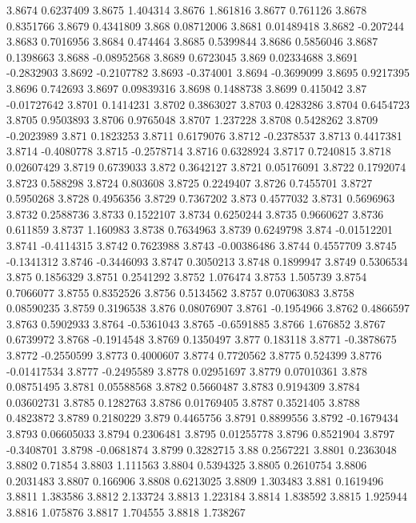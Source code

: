 3.8674  0.6237409
3.8675  1.404314
3.8676  1.861816
3.8677  0.761126
3.8678  0.8351766
3.8679  0.4341809
3.868  0.08712006
3.8681  0.01489418
3.8682  -0.207244
3.8683  0.7016956
3.8684  0.474464
3.8685  0.5399844
3.8686  0.5856046
3.8687  0.1398663
3.8688  -0.08952568
3.8689  0.6723045
3.869  0.02334688
3.8691  -0.2832903
3.8692  -0.2107782
3.8693  -0.374001
3.8694  -0.3699099
3.8695  0.9217395
3.8696  0.742693
3.8697  0.09839316
3.8698  0.1488738
3.8699  0.415042
3.87  -0.01727642
3.8701  0.1414231
3.8702  0.3863027
3.8703  0.4283286
3.8704  0.6454723
3.8705  0.9503893
3.8706  0.9765048
3.8707  1.237228
3.8708  0.5428262
3.8709  -0.2023989
3.871  0.1823253
3.8711  0.6179076
3.8712  -0.2378537
3.8713  0.4417381
3.8714  -0.4080778
3.8715  -0.2578714
3.8716  0.6328924
3.8717  0.7240815
3.8718  0.02607429
3.8719  0.6739033
3.872  0.3642127
3.8721  0.05176091
3.8722  0.1792074
3.8723  0.588298
3.8724  0.803608
3.8725  0.2249407
3.8726  0.7455701
3.8727  0.5950268
3.8728  0.4956356
3.8729  0.7367202
3.873  0.4577032
3.8731  0.5696963
3.8732  0.2588736
3.8733  0.1522107
3.8734  0.6250244
3.8735  0.9660627
3.8736  0.611859
3.8737  1.160983
3.8738  0.7634963
3.8739  0.6249798
3.874  -0.01512201
3.8741  -0.4114315
3.8742  0.7623988
3.8743  -0.00386486
3.8744  0.4557709
3.8745  -0.1341312
3.8746  -0.3446093
3.8747  0.3050213
3.8748  0.1899947
3.8749  0.5306534
3.875  0.1856329
3.8751  0.2541292
3.8752  1.076474
3.8753  1.505739
3.8754  0.7066077
3.8755  0.8352526
3.8756  0.5134562
3.8757  0.07063083
3.8758  0.08590235
3.8759  0.3196538
3.876  0.08076907
3.8761  -0.1954966
3.8762  0.4866597
3.8763  0.5902933
3.8764  -0.5361043
3.8765  -0.6591885
3.8766  1.676852
3.8767  0.6739972
3.8768  -0.1914548
3.8769  0.1350497
3.877  0.183118
3.8771  -0.3878675
3.8772  -0.2550599
3.8773  0.4000607
3.8774  0.7720562
3.8775  0.524399
3.8776  -0.01417534
3.8777  -0.2495589
3.8778  0.02951697
3.8779  0.07010361
3.878  0.08751495
3.8781  0.05588568
3.8782  0.5660487
3.8783  0.9194309
3.8784  0.03602731
3.8785  0.1282763
3.8786  0.01769405
3.8787  0.3521405
3.8788  0.4823872
3.8789  0.2180229
3.879  0.4465756
3.8791  0.8899556
3.8792  -0.1679434
3.8793  0.06605033
3.8794  0.2306481
3.8795  0.01255778
3.8796  0.8521904
3.8797  -0.3408701
3.8798  -0.0681874
3.8799  0.3282715
3.88  0.2567221
3.8801  0.2363048
3.8802  0.71854
3.8803  1.111563
3.8804  0.5394325
3.8805  0.2610754
3.8806  0.2031483
3.8807  0.166906
3.8808  0.6213025
3.8809  1.303483
3.881  0.1619496
3.8811  1.383586
3.8812  2.133724
3.8813  1.223184
3.8814  1.838592
3.8815  1.925944
3.8816  1.075876
3.8817  1.704555
3.8818  1.738267
